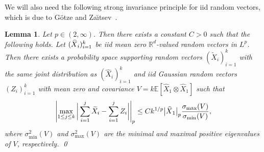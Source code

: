 \documentclass[11pt,a4paper,reqno,oneside]{amsart}
\newcommand{\R}{\ensuremath{\mathbb{R}}}%
\newcommand{\pnorm}[1]{\left|#1\right|}
\newcommand{\shat}[1]{\vphantom{#1}\smash[t]{\widehat{#1}}}
\newtheorem{lemma}[theorem]{Lemma}
\theoremstyle{definition}
\theoremstyle{remark}
\numberwithin{equation}{section}
\begin{document}
	We will also need the following strong invariance principle for iid random vectors, which is due to G\"otze and Za\u{\i}tsev~\cite[Theorem 3]{gotze_zaitsev_multidim_invariance}.
	\begin{lemma}\label{lemma:gotze_zaitsev}Let $ p\in(2,\infty) $. Then there exists a constant $ C>0 $ such that the following holds. Let $ (\shat X_i)_{i=1}^k $ be iid mean zero $\R^d$-valued random vectors in $ L^p $. Then there exists a probability space supporting random vectors $ (\widetilde X_i)_{i=1}^k $ with the same joint distribution as $ (\widehat X_i)_{i=1}^k $ and iid Gaussian random vectors $ (Z_i)_{i=1}^k $ with mean zero and covariance $V = k{\mathbb{E}[\widehat X_1 \otimes \widehat X_1]}$ such that
		\[ \pnorm{\max_{1\le j \le k}\bigg|\sum_{i=1}^j \widetilde X_i-\sum_{i=1}^j Z_i  \bigg|}_p\le Ck^{1/p}\big|\shat X_1\big|_p\frac{\sigma_{\max}(V)}{\sigma_{\min}(V)}, \]
		where $ \sigma^2_{\min}(V) $ and $ \sigma^2_{\max}(V) $ are the minimal and maximal positive eigenvalues of $V$, respectively. \qed
	\end{lemma}
	
\end{document}
